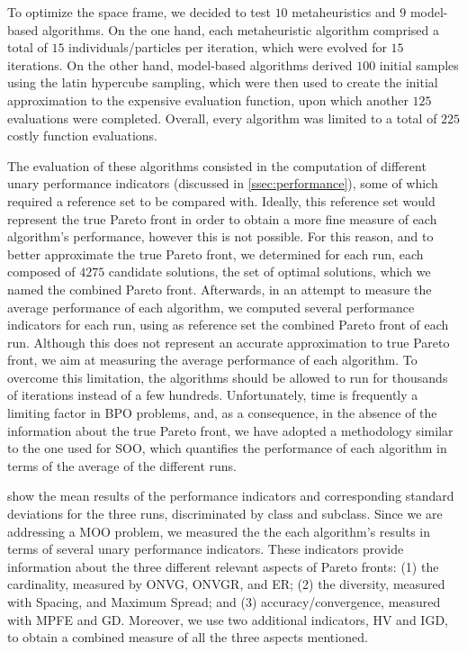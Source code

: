 To optimize the space frame, we decided to test $10$ metaheuristics and $9$ model-based algorithms. On the one hand, each metaheuristic algorithm comprised a total of $15$ individuals/particles per iteration, which were evolved for $15$ iterations. On the other hand, model-based algorithms derived $100$ initial samples using the latin hypercube sampling, which were then used to create the initial approximation to the expensive evaluation function, upon which another $125$ evaluations were completed. Overall, every algorithm was limited to a total of $225$ costly function evaluations. 

The evaluation of these algorithms consisted in the computation of different unary performance indicators (discussed in \cref{ssec:performance}), some of which required a reference set to be compared with. Ideally, this reference set would represent the true Pareto front in order to obtain a more fine measure of each algorithm's performance, however this is not possible. For this reason, and to better approximate the true Pareto front, we determined for each run, each composed of $4275$ candidate solutions, the set of optimal solutions, which we named the combined Pareto front. Afterwards, in an attempt to measure the average performance of each algorithm, we computed several performance indicators for each run, using as reference set the combined Pareto front of each run. Although this does not represent an accurate approximation to true Pareto front, we aim at measuring the average performance of each algorithm. To overcome this limitation, the algorithms should be allowed to run for thousands of iterations instead of a few hundreds. Unfortunately, time is frequently a limiting factor in \ac{BPO} problems, and, as a consequence, in the absence of the information about the true Pareto front, we have adopted a methodology similar to the one used for \ac{SOO}, which quantifies the performance of each algorithm in terms of the average of the different runs. 

 show the mean results of the performance indicators and corresponding standard deviations for the three runs, discriminated by class and subclass. Since we are addressing a \ac{MOO} problem, we measured the the each algorithm's results in terms of several unary performance indicators. These indicators provide information about the three different relevant aspects of Pareto fronts: (1) the cardinality, measured by \ac{ONVG}, \ac{ONVGR}, and \ac{ER}; (2) the diversity, measured with Spacing, and Maximum Spread; and (3) accuracy/convergence, measured with \ac{MPFE} and \ac{GD}. Moreover, we use two additional indicators, \ac{HV} and \ac{IGD}, to obtain a combined measure of all the three aspects mentioned. %

